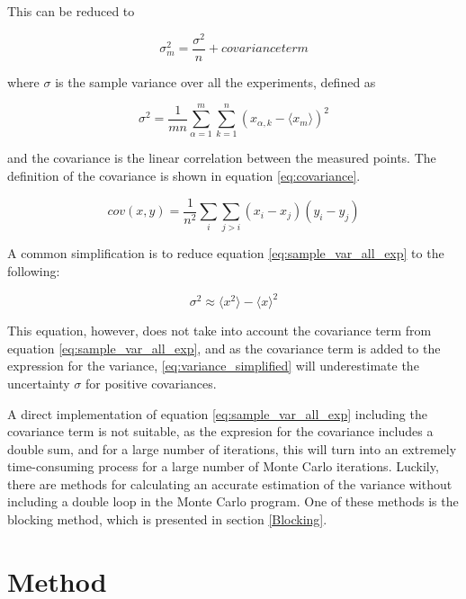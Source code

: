 \documentclass[norsk,a4paper,12pt]{article}
\begin{document}
This can be reduced to 

\begin{equation}
\label{eq:sample_var_all_exp}
\sigma_m^2 = \frac{\sigma^2}{n} + covariance term
\end{equation}

where $\sigma$ is the sample variance over all the experiments, defined as 

\begin{equation}
\sigma^2 = \frac{1}{mn} \sum_{\alpha=1}^m \sum_{k=1}^n (x_{\alpha, k} - \langle x_m \rangle )^2
\end{equation}

and the covariance is the linear correlation between the measured points. The definition of the covariance is shown in equation \ref{eq:covariance}.

\begin{equation}
\label{eq:covariance}
cov(x,y) = \frac{1}{n^2} \sum_i \sum_{j >i} (x_i - x_j) (y_i - y_j)
\end{equation}

A common simplification is to reduce equation \ref{eq:sample_var_all_exp} to the following:

\begin{equation}
\label{eq:variance_simplified}
\sigma^2 \approx \langle x^2 \rangle - \langle x \rangle^2
\end{equation}

This equation, however, does not take into account the covariance term from equation \ref{eq:sample_var_all_exp}, and as the covariance term is added to the expression for the variance, \ref{eq:variance_simplified} will underestimate the uncertainty $\sigma$ for positive covariances.

A direct implementation of equation \ref{eq:sample_var_all_exp} including the covariance term is not suitable, as the expresion for the covariance includes a double sum, and for a large number of iterations, this will turn into an extremely time-consuming process for a large number of Monte Carlo iterations. Luckily, there are methods for calculating an accurate estimation of the variance without including a double loop in the Monte Carlo program. One of these methods is the blocking method, which is presented in section \ref{Blocking}.

\section{Method} \label{Method}
\end{document}
